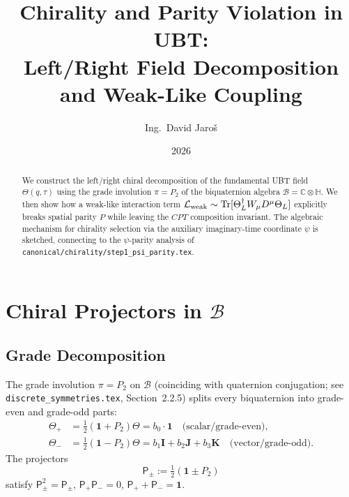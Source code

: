 \documentclass[12pt,a4paper]{article}
\title{\textbf{Chirality and Parity Violation in UBT:\\
                 Left/Right Field Decomposition and Weak-Like Coupling}}
\author{Ing.\ David Jaro\v{s}}
\date{2026}
\theoremstyle{definition}
\theoremstyle{remark}
\begin{document}
  \maketitle

  \begin{abstract}
  We construct the left/right chiral decomposition of the fundamental UBT field
  $\Theta(q,\tau)$ using the grade involution $\pi = P_2$ of the biquaternion
  algebra $\mathcal{B}=\mathbb{C}\otimes\mathbb{H}$.
  We then show how a weak-like interaction term
  $\mathcal{L}_{\rm weak}\sim\mathrm{Tr}[\Theta_L^\dagger W_\mu D^\mu\Theta_L]$
  explicitly breaks spatial parity $P$ while leaving the $CPT$ composition
  invariant.
  The algebraic mechanism for chirality selection via the auxiliary imaginary-time
  coordinate $\psi$ is sketched, connecting to the $\psi$-parity analysis of
  \texttt{canonical/chirality/step1\_psi\_parity.tex}.
  \end{abstract}
\fi

\section{Chiral Projectors in $\mathcal{B}$}
\label{sec:chir:projectors}

\subsection{Grade Decomposition}

The grade involution $\pi = P_2$ on $\mathcal{B}$ (coinciding with quaternion
conjugation; see \texttt{discrete\_symmetries.tex}, Section~2.2.5) splits
every biquaternion into grade-even and grade-odd parts:
\begin{align}
  \Theta_+ &= \tfrac{1}{2}(\mathbf{1} + P_2)\Theta
  = b_0\cdot\mathbf{1}
  \quad \text{(scalar/grade-even)}, \label{eq:chir:Theta_plus} \\
  \Theta_- &= \tfrac{1}{2}(\mathbf{1} - P_2)\Theta
  = b_1\mathbf{I} + b_2\mathbf{J} + b_3\mathbf{K}
  \quad \text{(vector/grade-odd)}. \label{eq:chir:Theta_minus}
\end{align}
The projectors
\begin{equation}
  \mathsf{P}_\pm := \tfrac{1}{2}(\mathbf{1} \pm P_2)
  \label{eq:chir:projectors}
\end{equation}
satisfy $\mathsf{P}_\pm^2 = \mathsf{P}_\pm$, $\mathsf{P}_+\mathsf{P}_-=0$,
$\mathsf{P}_+ + \mathsf{P}_- = \mathbf{1}$.
\end{document}
